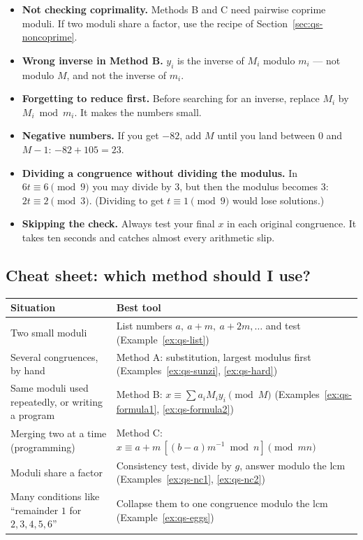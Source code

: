 \documentclass[11pt]{article}
\theoremstyle{definition}
\theoremstyle{remark}
\begin{document}
\begin{itemize}[leftmargin=1.4em,itemsep=2pt]
\item \textbf{Not checking coprimality.} Methods B and C need pairwise coprime moduli. If two moduli share a factor, use the recipe of Section~\ref{sec:qs-noncoprime}.
\item \textbf{Wrong inverse in Method B.} $y_i$ is the inverse of $M_i$ modulo $m_i$ --- not modulo $M$, and not the inverse of $m_i$.
\item \textbf{Forgetting to reduce first.} Before searching for an inverse, replace $M_i$ by $M_i\bmod m_i$. It makes the numbers small.
\item \textbf{Negative numbers.} If you get $-82$, add $M$ until you land between $0$ and $M-1$: $-82+105=23$.
\item \textbf{Dividing a congruence without dividing the modulus.} In $6t\equiv6\pmod 9$ you may divide by $3$, but then the modulus becomes $3$: $2t\equiv2\pmod 3$. (Dividing to get $t\equiv1 \pmod 9$ would lose solutions.)
\item \textbf{Skipping the check.} Always test your final $x$ in each original congruence. It takes ten seconds and catches almost every arithmetic slip.
\end{itemize}

\subsection{Cheat sheet: which method should I use?}

\begin{center}
\renewcommand{\arraystretch}{1.5}
\begin{tabular}{p{4.6cm}p{9.4cm}}
\toprule
\textbf{Situation} & \textbf{Best tool} \\
\midrule
Two small moduli & List numbers $a,\ a+m,\ a+2m,\dots$ and test (Example~\ref{ex:qs-list}) \\
Several congruences, by hand & Method A: substitution, largest modulus first (Examples~\ref{ex:qs-sunzi}, \ref{ex:qs-hard}) \\
Same moduli used repeatedly, or writing a program & Method B: $x\equiv\sum a_iM_iy_i \pmod M$ (Examples~\ref{ex:qs-formula1}, \ref{ex:qs-formula2}) \\
Merging two at a time (programming) & Method C: $x\equiv a+m\,[(b-a)m^{-1} \bmod n]\pmod{mn}$ \\
Moduli share a factor & Consistency test, divide by $g$, answer modulo the lcm (Examples~\ref{ex:qs-nc1}, \ref{ex:qs-nc2}) \\
Many conditions like ``remainder $1$ for $2,3,4,5,6$'' & Collapse them to one congruence modulo the lcm (Example~\ref{ex:qs-eggs}) \\
\bottomrule
\end{tabular}
\end{center}
\end{document}
